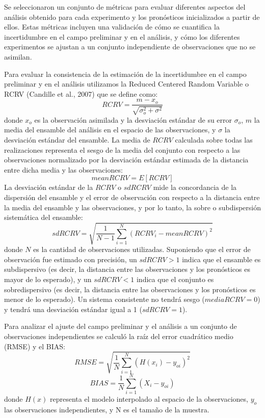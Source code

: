 \documentclass[12pt,oneside,a4paper]{reedthesis}
\begin{document}
Se seleccionaron un conjunto de métricas para evaluar diferentes aspectos del análisis obtenido para cada experimento y los pronósticos inicializados a partir de ellos. Estas métricas incluyen una validación de cómo se cuantifica la incertidumbre en el campo preliminar y en el análisis, y cómo los diferentes experimentos se ajustan a un conjunto independiente de observaciones que no se asimilan.

Para evaluar la consistencia de la estimación de la incertidumbre en el campo preliminar y en el análisis utilizamos la Reduced Centered Random Variable o RCRV (Candille et al., 2007) que se define como:
\begin{equation}
\mathit{RCRV} = \frac{m - x_o}{\sqrt{\sigma_o^2 + \sigma^2}}
\label{eq:eq6}
\end{equation}
donde \(x_o\) es la observación asimilada y la desviación estándar de su error \(\sigma_o\), \(m\) la media del ensamble del análisis en el espacio de las observaciones, y \(\sigma\) la desviación estándar del ensamble.
La media de \(RCRV\) calculada sobre todas las realizaciones representa el sesgo de la media del conjunto con respecto a las observaciones normalizado por la desviación estándar estimada de la distancia entre dicha media y las observaciones:
\begin{equation}
\mathit{mean RCRV} = E[RCRV]
\label{eq:eq7}
\end{equation}
La desviación estándar de la \(RCRV\) o \(sd RCRV\) mide la concordancia de la dispersión del ensamble y el error de observación con respecto a la distancia entre la media del ensamble y las observaciones, y por lo tanto, la sobre o subdispersión sistemática del ensamble:
\begin{equation}
\mathit{sd RCRV} = \sqrt{\frac{1}{N -1}\sum_{i=1}^{N}(RCRV_i - \mathit{mean RCRV})^2}
\label{eq:eq8}
\end{equation}
donde \(N\) es la cantidad de observaciones utilizadas. Suponiendo que el error de observación fue estimado con precisión, un \(sd RCRV > 1\) indica que el ensamble es subdispersivo (es decir, la distancia entre las observaciones y los pronósticos es mayor de lo esperado), y un \(sd RCRV < 1\) indica que el conjunto es sobredispersivo (es decir, la distancia entre las observaciones y los pronósticos es menor de lo esperado). Un sistema consistente no tendrá sesgo (\(media RCRV = 0\)) y tendrá una desviación estándar igual a 1 (\(sd RCRV = 1\)).

Para analizar el ajuste del campo preliminar y el análisis a un conjunto de observaciones independientes se calculó la raíz del error cuadrático medio (RMSE) y el BIAS:
\begin{equation}
\mathit{RMSE} = \sqrt{\frac{1}{N}\sum_{i = 1}^{N} (H(x_i) - y_{oi})^{2}}
\label{eq:eq9}
\end{equation}
\begin{equation}
\mathit{BIAS} = \frac{1}{N}\sum_{i = 1}^{N} (X_i - y_{oi})
\label{eq:eq10}
\end{equation}
donde \(H(x)\) representa el modelo interpolado al espacio de la observaciones, \(y_{o}\) las observaciones independientes, y N es el tamaño de la muestra.
\end{document}
